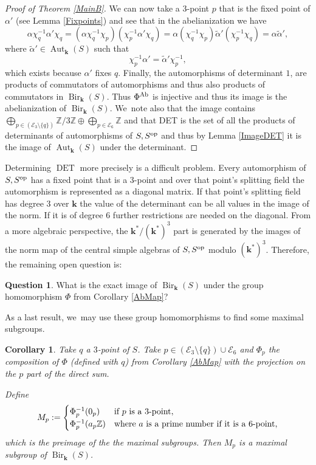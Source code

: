 \documentclass[JEP,XML,SOM,Unicode,NoFloatCountersInSection, NoEqCountersInSection,published]{cedram}
\newcommand{\Ab}{\textup{Ab}}
\newcommand{\op}{\textup{op}}
\DeclareMathOperator{\DET}{DET}
\newtheorem{corollary}[theorem]{Corollary}
\theoremstyle{definition}
\newtheorem*{question}{Question}
\newcommand{\kk}{{\boldsymbol{k}}}
\DeclareMathOperator{\Bir}{Bir}
\DeclareMathOperator{\Aut}{Aut}
\begin{document}
\begin{proof}[Proof of Theorem \ref{MainB}]
We can now take a $3$\nobreakdash-point $p$ that is the fixed point of $\alpha'$ (see Lemma \ref{Fixpoints}) and see that in the abelianization we have
\[
\alpha \chi_q^{-1} \alpha' \chi_q = (\alpha \chi_q^{-1} \chi_p) (\chi_p^{-1}\alpha' \chi_q) = \alpha (\chi_q^{-1} \chi_p) \tilde \alpha' (\chi_p^{-1} \chi_q) = \alpha \tilde \alpha',
\]
where $\tilde \alpha' \in \Aut_{\kk}(S)$ such that
\[
\chi_p^{-1} \alpha' = \tilde \alpha' \chi_p^{-1},
\]
which exists because $\alpha'$ fixes $q$.
Finally, the automorphisms of determinant $1$, are products of commutators of automorphisms and thus also products of commutators in $\Bir_{\kk}(S)$. Thus $\Phi^{\Ab}$ is injective and thus its image is the abelianization of $\Bir_{\kk}(S)$. We~note also that the image contains $\bigoplus_{p \in (\mathcal{E}_3 \setminus \{ q \})} \mathbb{Z}/3\mathbb{Z} \oplus \bigoplus_{p \in \mathcal{E}_6} \mathbb{Z}$ and that DET is the set of all the products of determinants of automorphisms of $S,S^{\op}$ and thus by Lemma \ref{ImageDET} it is the image of $\Aut_{\kk}(S)$ under the determinant.
\end{proof}

Determining $\DET$ more precisely is a difficult problem. Every automorphism of $S,S^{\op}$ has a fixed point that is a $3$\nobreakdash-point and over that point's splitting field the automorphism is represented as a diagonal matrix. If that point's splitting field has degree $3$ over $\kk$ the value of the determinant can be all values in the image of the norm. If it is of degree $6$ further restrictions are needed on the diagonal. From a more algebraic perspective, the $\kk^*/(\kk^*)^3$ part is generated by the images of the norm map of the central simple algebras of $S,S^{\op}$ modulo $(\kk^*)^3$. Therefore, the remaining open question is:

\begin{question}
What is the exact image of $\Bir_{\kk}(S)$ under the group homomorphism $\Phi$ from Corollary \ref{AbMap}?
\end{question}
As a last result, we~may use these group homomorphisms to find some maximal subgroups.
\begin{corollary}
Take $q$ a $3$\nobreakdash-point of $S$. Take $p \in (\mathcal{E}_3 \setminus \{ q \}) \cup \mathcal{E}_6$ and $\Phi_{p}$ the composition of $\Phi$ (defined with $q$) from Corollary \ref{AbMap} with the projection on the $p$ part of the direct sum.

Define
\[
M_p := \begin{cases} \Phi_p^{-1}(0_p) &\text{if $p$ is a $3$\nobreakdash-point}, \\ \Phi_p^{-1}(a_p\mathbb{Z}) & \text{where $a$ is a prime number if it is a $6$\nobreakdash-point},
\end{cases}
\]
which is the preimage of the the maximal subgroups. Then $M_p$ is a maximal subgroup of $\Bir_{\kk}(S)$.
\end{corollary}
\end{document}
